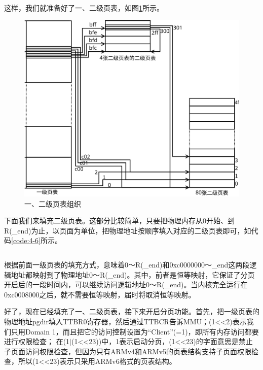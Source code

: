 \documentclass[main.tex]{subfiles}
\begin{document}
\begin{CJK*}{UTF8}{song}
这样，我们就准备好了一、二级页表，如图\ref{figure:4-6}所示。

\begin{figure}[htp]
\centering
\includegraphics[scale=0.3]{figures/4-6}
\caption{一、二级页表组织}
\label{figure:4-6}
\end{figure}

\par
下面我们来填充二级页表。这部分比较简单，只要把物理内存从0开始、到R(\_end)为止，以页面为单位，把物理地址按顺序填入对应的二级页表即可，如代码\ref{code:4-6}所示。

\begin{code}
\label{code:4-6}
\inputminted[firstline=179,lastline=185,linenos,numbersep=5pt,frame=lines,framesep=2mm]{c}{src/chapter04/kernel/machdep.c}
\end{code}

根据前面一级页表的填充方式，意味着0～R(\_end)和0xc0000000～\_end这两段逻辑地址都映射到了物理地址0～R(\_end)。其中，前者是恒等映射，它保证了分页开启后的一段时间内，可以继续访问逻辑地址0～R(\_end)。当内核完全运行在0xc0008000之后，就不需要恒等映射，届时将取消恒等映射。

\par
好了，现在已经填充了一、二级页表，接下来开启分页功能。首先，把一级页表的物理地址pgdir填入TTBR0寄存器，然后通过TTBCR告诉MMU；(1\textless\textless2)表示我们只用Domain 1，而且把它的访问控制设置为“Client”(=1)，即所有内存访问都要进行权限检查； 在(1$\mid$(1\textless\textless23))中，1表示启动分页，(1\textless\textless23)的字面意思是禁止子页面访问权限检查，但因为只有ARMv4和ARMv5的页表结构支持子页面权限检查，所以(1\textless\textless23)表示只采用ARMv6格式的页表结构。


\end{CJK*}
\end{document}
